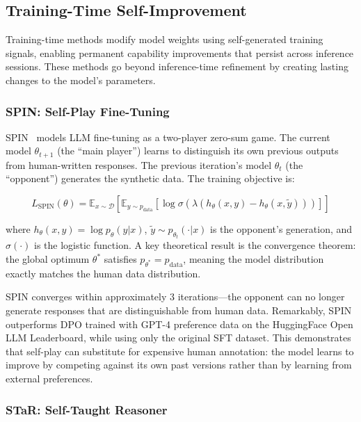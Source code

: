 \documentclass[11pt,a4paper]{article}
\begin{document}
\subsection{Training-Time Self-Improvement}

Training-time methods modify model weights using self-generated training signals, enabling permanent capability improvements that persist across inference sessions. These methods go beyond inference-time refinement by creating lasting changes to the model's parameters.

\subsubsection{SPIN: Self-Play Fine-Tuning}

SPIN~\citep{spin2024} models LLM fine-tuning as a two-player zero-sum game. The current model $\theta_{t+1}$ (the ``main player'') learns to distinguish its own previous outputs from human-written responses. The previous iteration's model $\theta_t$ (the ``opponent'') generates the synthetic data. The training objective is:

\begin{equation}
L_{\text{SPIN}}(\theta) = \mathbb{E}_{x \sim \mathcal{D}} \left[ \mathbb{E}_{y \sim p_{\text{data}}} \left[ \log \sigma\left( \lambda \left( h_\theta(x, y) - h_\theta(x, \tilde{y}) \right) \right) \right] \right]
\end{equation}

\noindent where $h_\theta(x,y) = \log p_\theta(y|x)$, $\tilde{y} \sim p_{\theta_t}(\cdot|x)$ is the opponent's generation, and $\sigma(\cdot)$ is the logistic function. A key theoretical result is the convergence theorem: the global optimum $\theta^*$ satisfies $p_{\theta^*} = p_{\text{data}}$, meaning the model distribution exactly matches the human data distribution.

SPIN converges within approximately 3 iterations---the opponent can no longer generate responses that are distinguishable from human data. Remarkably, SPIN outperforms DPO trained with GPT-4 preference data on the HuggingFace Open LLM Leaderboard, while using only the original SFT dataset. This demonstrates that self-play can substitute for expensive human annotation: the model learns to improve by competing against its own past versions rather than by learning from external preferences.

\subsubsection{STaR: Self-Taught Reasoner}
\end{document}
